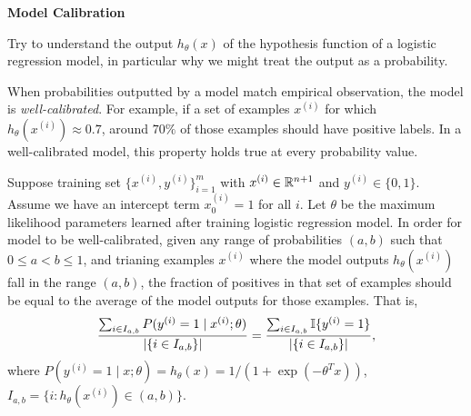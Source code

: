\documentclass[12pt,letterpaper,boxed]{hmcpset}
\newcommand{\yy}{y^{(i)}}
\newcommand{\xx}{x^{(i)}}
\newcommand{\ind}[1]{\mathbb{I}\{#1\}}
\begin{document}
\begin{problem}[Problem 2]
  \textbf{Model Calibration}

  Try to understand the output $h_\theta (x)$ of the hypothesis function of a logistic regression model, in particular why we might treat the output as a probability.

  When probabilities outputted by a model match empirical observation, the model is \emph{well-calibrated}. For example, if a set of examples $\xx$ for which $h_\theta(\xx) \approx 0.7$, around $70\%$ of those examples should have positive labels. In a well-calibrated model, this property holds true at every probability value. 

  Suppose training set $\{\xx, \yy\}_{i=1}^m$ with $\xx \in \R^{n+1}$ and $\yy \in \{0,1\}$. Assume we have an intercept term $\xx_0 = 1$ for all $i$. Let $\theta$ be the maximum likelihood parameters learned after training logistic regression model. In order for model to be well-calibrated, given any range of probabilities $(a,b)$ such that $0 \leq a < b \leq 1$, and trianing examples $\xx$ where the model outputs $h_\theta (\xx)$ fall in the range $(a,b)$, the fraction of positives in that set of examples should be equal to the average of the model outputs for those examples. That is,
  \[
  \frac{\sum_{i \in I_{a,b}} P(\yy = 1 \mid \xx; \theta)}{\abs{\{i \in I_{a,b}\}}} = \frac{\sum_{i \in I_{a,b}} \ind{\yy = 1}}{\abs{ \{i \in I_{a,b}\} }},
  \]
  where $P(\yy = 1 \mid x; \theta) = h_{\theta} (x) = 1/(1+\exp(-\theta^T x))$, $I_{a,b} = \{i : h_\theta(\xx) \in (a,b) \}$.
\end{problem}
\end{document}
